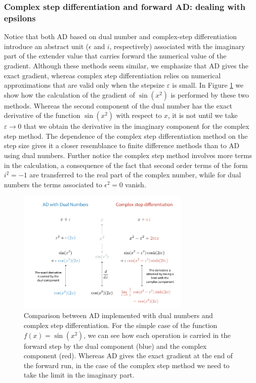 \subsubsection{Complex step differentiation and forward AD: dealing with epsilons}

Notice that both AD based on dual number and complex-step differentiation introduce an abstract unit ($\epsilon$ and $i$, respectively) associated with the imaginary part of the extender value that carries forward the numerical value of the gradient.
Although these methods seem similar, we emphasize that AD gives the exact gradient, whereas complex step differentiation relies on numerical approximations that are valid only when the stepsize $\varepsilon$ is small. 
In Figure \ref{fig:complex-step-AD} we show how the calculation of the gradient of $\sin (x^2)$ is performed by these two methods.
Whereas the second component of the dual number has the exact derivative of the function $\sin(x^2)$ with respect to $x$, it is not until we take $\varepsilon \rightarrow 0$ that we obtain the derivative in the imaginary component for the complex step method.
The dependence of the complex step differentiation method on the step size gives it a closer resemblance to finite difference methods than to AD using dual numbers.
Further notice the complex step method involves more terms in the calculation, a consequence of the fact that second order terms of the form $i^2 = -1$ are transferred to the real part of the complex number, while for dual numbers the terms associated to $\epsilon^2 = 0$ vanish. 
\begin{figure}[t]
    \centering
    \includegraphics[width=0.75\textwidth]{tex/figures/complex-step-AD.pdf}
    \caption{Comparison between AD implemented with dual numbers and complex step differentiation. For the simple case of the function $f(x) = \sin(x^2)$, we can see how each operation is carried in the forward step by the dual component (blue) and the complex component (red). Whereas AD gives the exact gradient at the end of the forward run, in the case of the complex step method we need to take the limit in the imaginary part. }
    \label{fig:complex-step-AD}
\end{figure}

